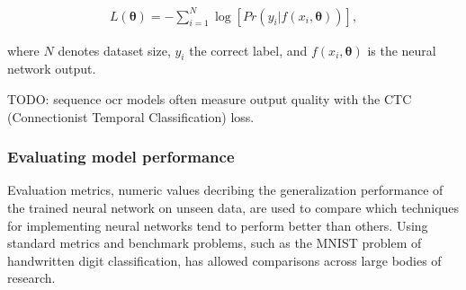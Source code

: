 \documentclass{article}
\begin{document}
\begin{align}
    L(\mathbf{\theta})=-\sum_{i=1}^{N}\log[Pr(y_i|f(x_i,\mathbf{\theta}))],
\end{align}

where $N$ denotes dataset size, $y_i$ the correct label, and $f(x_i, \mathbf{\theta})$ is the neural network output.



TODO: sequence ocr models often measure output quality with the CTC (Connectionist Temporal Classification) loss.



\subsubsection{Evaluating model performance}
\label{sect:eval_metrics}

Evaluation metrics, numeric values decribing the generalization performance of the trained neural network 
on unseen data, are used to compare which techniques for implementing neural networks tend to 
perform better than others. Using standard metrics 
and benchmark problems, such as the MNIST problem of handwritten digit 
classification, has allowed comparisons across large bodies of research.


\end{document}
